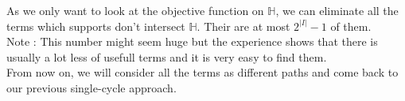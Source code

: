 As we only want to look at the objective function on $\mathbb{H}$, we can eliminate all the terms which supports don't intersect $\mathbb{H}$. Their are at most $2^{|I|}-1$ of them.\\
Note : This number might seem huge but the experience shows that there is usually a lot less of usefull terms and it is very easy to find them.\\
From now on, we will consider all the terms as different paths and come back to our previous single-cycle approach.